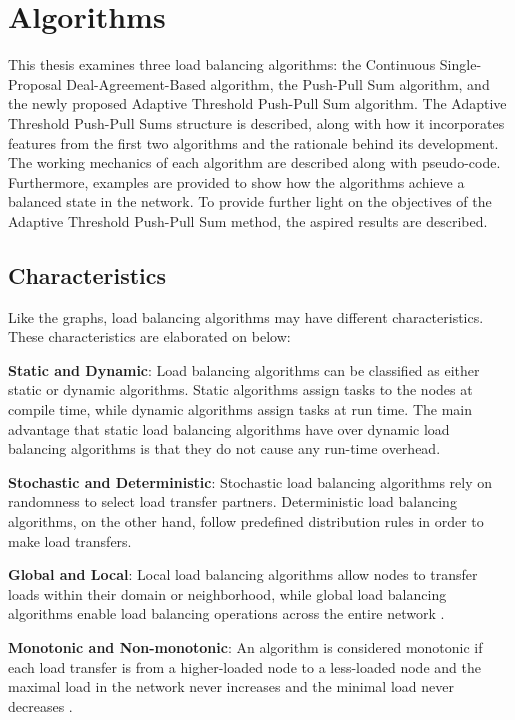 \chapter{Algorithms}\label{chap:algorithms}
This thesis examines three load balancing algorithms: the Continuous Single-Proposal Deal-Agreement-Based algorithm, the Push-Pull Sum algorithm, and the newly proposed Adaptive Threshold Push-Pull Sum algorithm. The Adaptive Threshold Push-Pull Sums structure is described, along with how it incorporates features from the first two algorithms and the rationale behind its development. The working mechanics of each algorithm are described along with pseudo-code. Furthermore, examples are provided to show how the algorithms achieve a balanced state in the network. To provide further light on the objectives of the Adaptive Threshold Push-Pull Sum method, the aspired results are described.

\section{Characteristics}\label{sec:algoCharacteristics}
Like the graphs, load balancing algorithms may have different characteristics. These characteristics are elaborated on below:

\textbf{Static and Dynamic}: Load balancing algorithms can be classified as either static or dynamic algorithms. Static algorithms assign tasks to the nodes at compile time, while dynamic algorithms assign tasks at run time. The main advantage that static load balancing algorithms have over dynamic load balancing algorithms is that they do not cause any run-time overhead. \cite{Bokhari}

\textbf{Stochastic and Deterministic}: Stochastic load balancing algorithms rely on randomness to select load transfer partners. Deterministic load balancing algorithms, on the other hand, follow predefined distribution rules in order to make load transfers. \cite{ChengzhongFrancis}

\textbf{Global and Local}: Local load balancing algorithms allow nodes to transfer loads within their domain or neighborhood, while global load balancing algorithms enable load balancing operations across the entire network \cite{ChengzhongFrancis}.

\textbf{Monotonic and Non-monotonic}: An algorithm is considered monotonic if each load transfer is from a higher-loaded node to a less-loaded node and the maximal load in the network never increases and the minimal load never decreases \cite{Dinitz2023DAB}.

